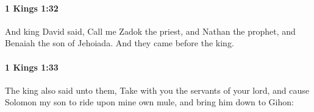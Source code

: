 		\paragraph{1 Kings 1:32} %
			\label{1KINGS-1-32}

			And king David said, Call me Zadok the priest, and Nathan the prophet, and Benaiah the son of Jehoiada. And they came before the king.


		\paragraph{1 Kings 1:33} %
			\label{1KINGS-1-33}

			The king also said unto them, Take with you the servants of your lord, and cause Solomon my son to ride upon mine own mule, and bring him down to Gihon:


